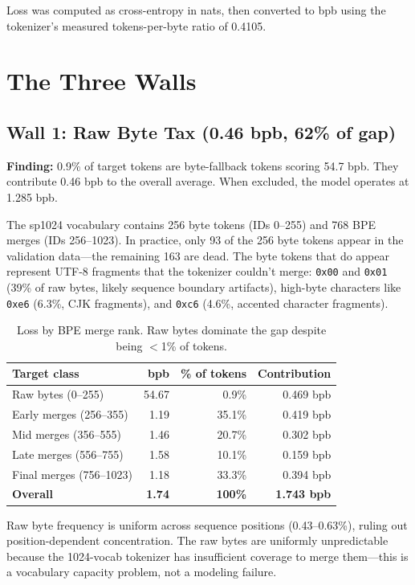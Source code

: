 \documentclass[11pt,a4paper]{report}
\newcommand{\finding}[1]{\textcolor{finding}{\textbf{Finding:}} #1}
\begin{document}
Loss was computed as cross-entropy in nats, then converted to bpb using the tokenizer's measured tokens-per-byte ratio of 0.4105.


\chapter{The Three Walls}

\section{Wall 1: Raw Byte Tax (0.46 bpb, 62\% of gap)}

\finding{0.9\% of target tokens are byte-fallback tokens scoring 54.7 bpb. They contribute 0.46 bpb to the overall average. When excluded, the model operates at 1.285 bpb.}

The sp1024 vocabulary contains 256 byte tokens (IDs 0--255) and 768 BPE merges (IDs 256--1023). In practice, only 93 of the 256 byte tokens appear in the validation data---the remaining 163 are dead. The byte tokens that do appear represent UTF-8 fragments that the tokenizer couldn't merge: \texttt{0x00} and \texttt{0x01} (39\% of raw bytes, likely sequence boundary artifacts), high-byte characters like \texttt{0xe6} (6.3\%, CJK fragments), and \texttt{0xc6} (4.6\%, accented character fragments).

\begin{table}[h]
\centering
\begin{tabular}{lrrr}
\toprule
\textbf{Target class} & \textbf{bpb} & \textbf{\% of tokens} & \textbf{Contribution} \\
\midrule
Raw bytes (0--255) & 54.67 & 0.9\% & 0.469 bpb \\
Early merges (256--355) & 1.19 & 35.1\% & 0.419 bpb \\
Mid merges (356--555) & 1.46 & 20.7\% & 0.302 bpb \\
Late merges (556--755) & 1.58 & 10.1\% & 0.159 bpb \\
Final merges (756--1023) & 1.18 & 33.3\% & 0.394 bpb \\
\midrule
\textbf{Overall} & \textbf{1.74} & \textbf{100\%} & \textbf{1.743 bpb} \\
\bottomrule
\end{tabular}
\caption{Loss by BPE merge rank. Raw bytes dominate the gap despite being $<$1\% of tokens.}
\label{tab:merge_rank}
\end{table}

Raw byte frequency is uniform across sequence positions (0.43--0.63\%), ruling out position-dependent concentration. The raw bytes are uniformly unpredictable because the 1024-vocab tokenizer has insufficient coverage to merge them---this is a vocabulary capacity problem, not a modeling failure.
\end{document}
